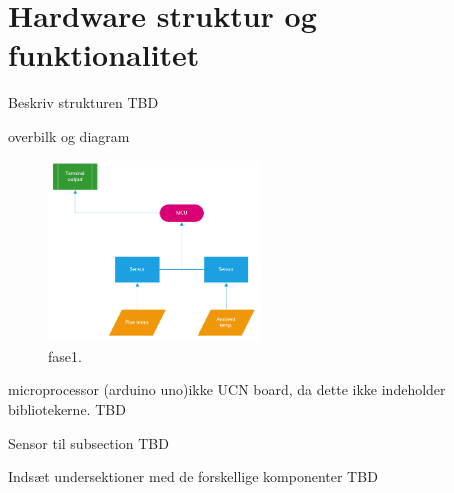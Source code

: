 \section{Hardware struktur og funktionalitet}
Beskriv strukturen TBD

overbilk og diagram

\begin{figure}[h!]
  \caption{fase1.}
  \centering
  \includegraphics[width=0.5\textwidth]{figures/Phase1.PNG}
\end{figure}


microprocessor (arduino uno)ikke UCN board, da dette ikke indeholder bibliotekerne. TBD

Sensor til subsection TBD



Indsæt undersektioner med de forskellige komponenter TBD
